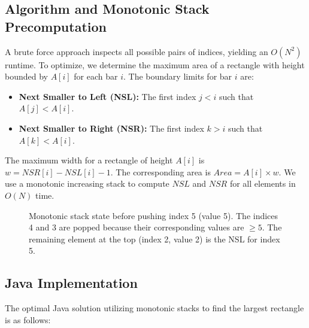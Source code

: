 \documentclass[10pt,journal,compsoc,onecolumn]{IEEEtran}
\begin{document}
\subsection{Algorithm and Monotonic Stack Precomputation}
A brute force approach inspects all possible pairs of indices, yielding an $O(N^2)$ runtime. To optimize, we determine the maximum area of a rectangle with height bounded by $A[i]$ for each bar $i$. The boundary limits for bar $i$ are:
\begin{itemize}
    \item \textbf{Next Smaller to Left (NSL):} The first index $j < i$ such that $A[j] < A[i]$.
    \item \textbf{Next Smaller to Right (NSR):} The first index $k > i$ such that $A[k] < A[i]$.
\end{itemize}
The maximum width for a rectangle of height $A[i]$ is $w = NSR[i] - NSL[i] - 1$. The corresponding area is $Area = A[i] \times w$.
We use a monotonic increasing stack to compute $NSL$ and $NSR$ for all elements in $O(N)$ time.

\begin{figure}[htbp]
\centering
{}
\caption{Monotonic stack state before pushing index 5 (value 5). The indices 4 and 3 are popped because their corresponding values are $\ge 5$. The remaining element at the top (index 2, value 2) is the NSL for index 5.}
\label{fig:nsl_stack}
\end{figure}

\subsection{Java Implementation}
The optimal Java solution utilizing monotonic stacks to find the largest rectangle is as follows:
\end{document}
